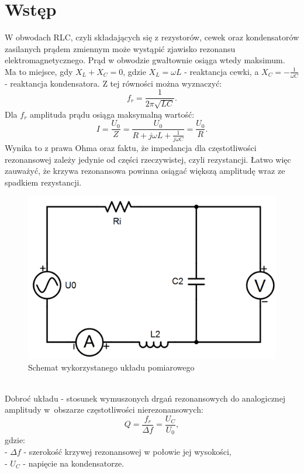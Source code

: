\documentclass[12pt, a4paper, oneside]{article}
\begin{document}
\section{Wstęp}
\indent\indent W obwodach RLC, czyli składających się z rezystorów, cewek oraz kondensatorów zasilanych prądem zmiennym może wystąpić zjawisko rezonansu elektromagnetycznego. Prąd w obwodzie gwałtownie osiąga wtedy maksimum. Ma to miejsce, gdy $X_L + X_C = 0$, gdzie $X_L =\omega L$ - reaktancja cewki, a $X_C = -\frac{1}{\omega C}$ - reaktancja kondensatora. Z tej równości można wyznaczyć:\\
\begin{equation}
f_{r} = \frac{1}{2\pi\sqrt{LC}}.
\end{equation}
Dla $f_{r}$ amplituda prądu osiąga maksymalną wartość:
\begin{equation}
I=\frac{U_0}{Z}=\frac{U_0}{R+j\omega L+\frac{1}{j\omega C}}=\frac{U_0}{R}.
\end{equation}
Wynika to z prawa Ohma oraz faktu, że impedancja dla częstotliwości rezonansowej zależy jedynie od części rzeczywistej, czyli rezystancji. Łatwo więc zauważyć, że krzywa rezonansowa powinna osiągać większą amplitudę wraz ze spadkiem rezystancji.
\begin{figure}[h!]
\centering
\caption{Schemat wykorzystanego układu pomiarowego}
\includegraphics[scale=0.35]{f1.png}
\end{figure}
\\\indent Dobroć układu - stosunek wymuszonych drgań rezonansowych do analogicznej amplitudy w~obszarze częstotliwości nierezonansowych:
\begin{equation}
Q=\frac{f_{r}}{\Delta f}=\frac{U_C}{U_0},
\end{equation}
gdzie:\\
- $\Delta f$ - szerokość krzywej rezonansowej w połowie jej wysokości,\\
- $U_C$ - napięcie na kondensatorze.
\end{document}
